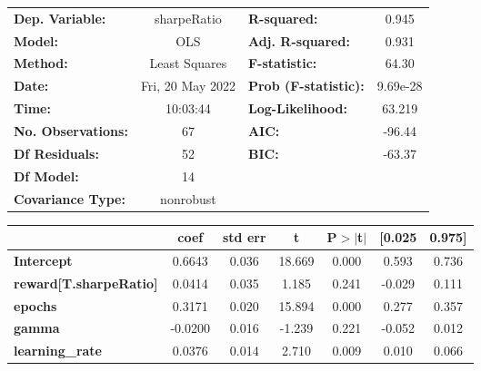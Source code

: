 \begin{center}
\begin{tabular}{lclc}
\toprule
\textbf{Dep. Variable:}              &   sharpeRatio    & \textbf{  R-squared:         } &     0.945   \\
\textbf{Model:}                      &       OLS        & \textbf{  Adj. R-squared:    } &     0.931   \\
\textbf{Method:}                     &  Least Squares   & \textbf{  F-statistic:       } &     64.30   \\
\textbf{Date:}                       & Fri, 20 May 2022 & \textbf{  Prob (F-statistic):} &  9.69e-28   \\
\textbf{Time:}                       &     10:03:44     & \textbf{  Log-Likelihood:    } &    63.219   \\
\textbf{No. Observations:}           &          67      & \textbf{  AIC:               } &    -96.44   \\
\textbf{Df Residuals:}               &          52      & \textbf{  BIC:               } &    -63.37   \\
\textbf{Df Model:}                   &          14      & \textbf{                     } &             \\
\textbf{Covariance Type:}            &    nonrobust     & \textbf{                     } &             \\
\bottomrule
\end{tabular}
\begin{tabular}{lcccccc}
                                     & \textbf{coef} & \textbf{std err} & \textbf{t} & \textbf{P$> |$t$|$} & \textbf{[0.025} & \textbf{0.975]}  \\
\midrule
\textbf{Intercept}                   &       0.6643  &        0.036     &    18.669  &         0.000        &        0.593    &        0.736     \\
\textbf{reward[T.sharpeRatio]}       &       0.0414  &        0.035     &     1.185  &         0.241        &       -0.029    &        0.111     \\
\textbf{epochs}                      &       0.3171  &        0.020     &    15.894  &         0.000        &        0.277    &        0.357     \\
\textbf{gamma}                       &      -0.0200  &        0.016     &    -1.239  &         0.221        &       -0.052    &        0.012     \\
\textbf{learning\_rate}              &       0.0376  &        0.014     &     2.710  &         0.009        &        0.010    &        0.066     \\

\end{tabular}
\end{center}
